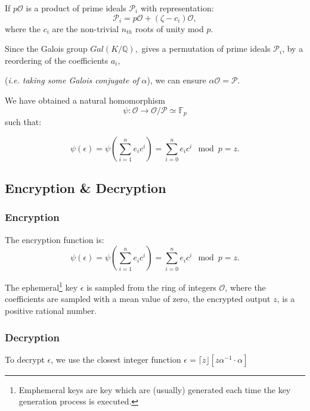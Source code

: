 
If $p\mathcal{O}$ is a product of prime ideals $\mathcal{P}_{i}$ with representation:  
$$\mathcal{P}_{i} = p\mathcal{O} + (\zeta-c_{i}) \mathcal{O},$$ 
 where the $c_{i}$ are the non-trivial $n_{th}$ roots of unity mod $p$. 
  
Since the Galois group $Gal(K/\mathbb{Q}),$ gives a permutation of prime ideals $\mathcal{P}_{i}$, by a reordering of the coefficients $a_{i}$, 

(\textit{i.e. taking some Galois conjugate of} $\mathit{\alpha}$), we can ensure $ \alpha \mathcal{O} = \mathcal{P} $. 
 
We have obtained a natural homomorphism  $$\psi : \mathcal{O} \rightarrow \mathcal{O}/\mathcal{P} \simeq \mathbb{F}_{p}$$ such that: 

$$ \psi(\epsilon) = \psi \left( \sum_{i=1}^{n}e_{i}c^{i} \right) = \sum_{i=0}^{n} e_{i}c^{i}\mod{p}=z. $$
  

\subsection{Encryption \& Decryption}

\subsubsection{Encryption}

The encryption function is:
$$ \psi(\epsilon) = \psi \left( \sum_{i=1}^{n}e_{i}c^{i} \right) = \sum_{i=0}^{n} e_{i}c^{i}\mod{p}=z. $$

The ephemeral\footnote{Emphemeral keys are key which are (usually)  generated each time the key generation process is executed. } key $\epsilon$ is sampled from the ring of integers $\mathcal{O}$, where the coefficients are sampled with a mean value of zero, the encrypted output $z$, is a positive rational number.

\subsubsection{Decryption}

To decrypt $\epsilon$, we use the closest integer function $\epsilon = \lceil z \rfloor [z\alpha^{-1}\cdot \alpha]$

